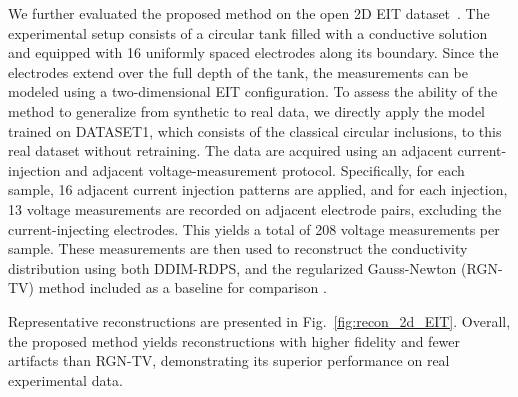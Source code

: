 \documentclass[a4paper,11pt]{article}
\theoremstyle{definition}
\theoremstyle{plain}
\theoremstyle{remark}
\begin{document}
We further evaluated the proposed method on the open 2D EIT dataset~\cite{hauptmann2017open}. The experimental setup consists of a circular tank filled with a conductive solution and equipped with 16 uniformly spaced electrodes along its boundary. Since the electrodes extend over the full depth of the tank, the measurements can be modeled using a two-dimensional EIT configuration.
To assess the ability of the method to generalize from synthetic to real data, we directly apply the model trained on DATASET1, which consists of the classical circular inclusions, to this real dataset without retraining. The data are acquired using an adjacent current-injection and adjacent voltage-measurement protocol. Specifically, for each sample, 16 adjacent current injection patterns are applied, and for each injection, 13 voltage measurements are recorded on adjacent electrode pairs, excluding the current-injecting electrodes. This yields a total of 208 voltage measurements per sample. These measurements are then used to reconstruct the conductivity distribution using both DDIM-RDPS, and the regularized Gauss-Newton (RGN-TV) method included as a baseline for comparison \cite{RGN2022,borsic2009vivo}.

Representative reconstructions are presented in Fig.~\ref{fig:recon_2d_EIT}. Overall, the proposed method yields reconstructions with higher fidelity and fewer artifacts than RGN-TV, demonstrating its superior performance on real experimental data.
\end{document}
